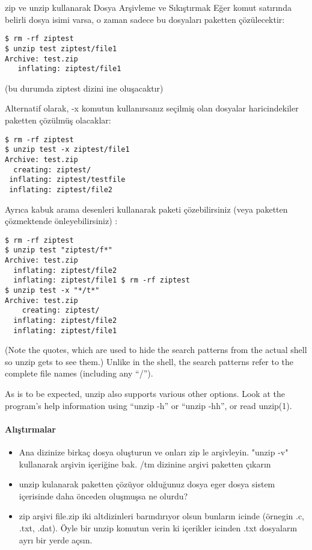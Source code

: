 \begin{section}{zip ve unzip kullanarak Dosya Arşivleme ve Sıkıştırmak}
Eğer komut satırında belirli dosya isimi varsa, o zaman sadece bu dosyaları paketten çözülecektir:
\begin{verbatim}
$ rm -rf ziptest
$ unzip test ziptest/file1 
Archive: test.zip
   inflating: ziptest/file1
\end{verbatim}
(bu durumda ziptest dizini ine oluşacaktır)

Alternatif olarak, -x komutun kullanırsanız seçilmiş olan dosyalar haricindekiler paketten çözülmüş olacaklar:
\begin{verbatim}
$ rm -rf ziptest
$ unzip test -x ziptest/file1 
Archive: test.zip
  creating: ziptest/ 
 inflating: ziptest/testfile
 inflating: ziptest/file2
\end{verbatim}
Ayrıca kabuk arama desenleri kullanarak paketi çözebilirsiniz (veya paketten çözmektende önleyebilirsiniz) :
\begin{verbatim}
$ rm -rf ziptest
$ unzip test "ziptest/f*" 
Archive: test.zip
  inflating: ziptest/file2
  inflating: ziptest/file1 $ rm -rf ziptest
$ unzip test -x "*/t*" 
Archive: test.zip
    creating: ziptest/ 
  inflating: ziptest/file2 
  inflating: ziptest/file1
\end{verbatim}

(Note the quotes, which are used to hide the search patterns from the actual shell so unzip gets to see them.) Unlike in the shell, the search patterns refer to the complete file names (including any “/”).

As is to be expected, unzip also supports various other options. Look at the
program’s help information using “unzip -h” or “unzip -hh”, or read unzip(1).

\paragraph{Alıştırmalar}{
\begin{itemize}
 \item Ana dizinize birkaç dosya oluşturun ve onları zip le arşivleyin. "unzip -v" kullanarak arşivin içeriğine bak. /tm dizinine arşivi paketten çıkarın
 \item unzip kulanarak paketten çözüyor olduğunuz dosya eger dosya sistem içerisinde daha önceden oluşmuşsa ne olurdu?
 \item zip arşivi file.zip iki altdizinleri barındırıyor olsun bunların icinde (örnegin .c, .txt, .dat). Öyle bir unzip komutun verin ki içerikler icinden .txt dosyaların ayrı bir yerde açsın.
\end{itemize}}
\end{section}